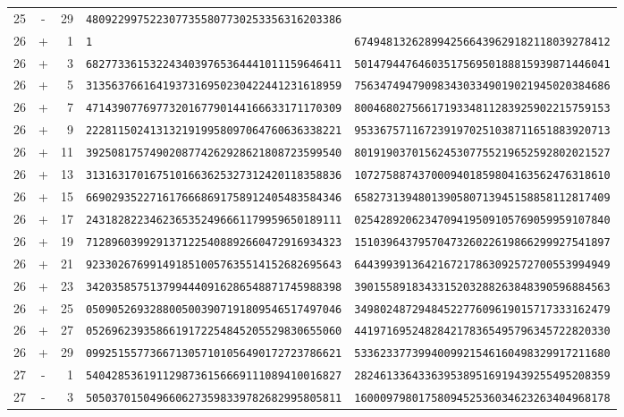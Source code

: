\begin{longtable}{@{}rcrll@{}}
25&-&29&\texttt{4809229975223077355807730253356316203386}&\texttt{}\\
26&+&1&\texttt{1}&\texttt{6749481326289942566439629182118039278412}\\
26&+&3&\texttt{6827733615322434039765364441011159646411}&\texttt{5014794476460351756950188815939871446041}\\
26&+&5&\texttt{3135637661641937316950230422441231618959}&\texttt{7563474947909834303349019021945020384686}\\
26&+&7&\texttt{4714390776977320167790144166633171170309}&\texttt{8004680275661719334811283925902215759153}\\
26&+&9&\texttt{2228115024131321919958097064760636338221}&\texttt{9533675711672391970251038711651883920713}\\
26&+&11&\texttt{3925081757490208774262928621808723599540}&\texttt{8019190370156245307755219652592802021527}\\
26&+&13&\texttt{3131631701675101663625327312420118358836}&\texttt{1072758874370009401859804163562476318610}\\
26&+&15&\texttt{6690293522716176668691758912405483584346}&\texttt{6582731394801390580713945158858112817409}\\
26&+&17&\texttt{2431828223462365352496661179959650189111}&\texttt{0254289206234709419509105769059959107840}\\
26&+&19&\texttt{7128960399291371225408892660472916934323}&\texttt{1510396437957047326022619866299927541897}\\
26&+&21&\texttt{9233026769914918510057635514152682695643}&\texttt{6443993913642167217863092572700553994949}\\
26&+&23&\texttt{3420358575137994440916286548871745988398}&\texttt{3901558918343315203288263848390596884563}\\
26&+&25&\texttt{0509052693288005003907191809546517497046}&\texttt{3498024872948452277609619015717333162479}\\
26&+&27&\texttt{0526962393586619172254845205529830655060}&\texttt{4419716952482842178365495796345722820330}\\
26&+&29&\texttt{0992515577366713057101056490172723786621}&\texttt{5336233773994009921546160498329917211680}\\
27&-&1&\texttt{5404285361911298736156669111089410016827}&\texttt{2824613364336395389516919439255495208359}\\
27&-&3&\texttt{5050370150496606273598339782682995805811}&\texttt{1600097980175809452536034623263404968178}\\

\end{longtable}
